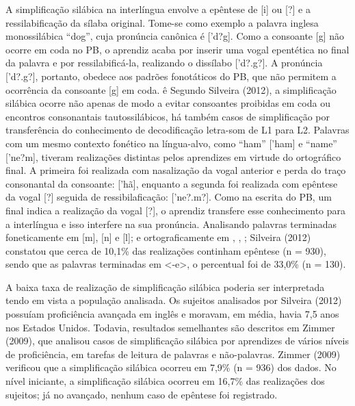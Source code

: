 A simplifica\c{c}\~ao sil\'abica na interl\'ingua envolve a ep\^entese de {[}i{]} ou
{[}?{]} e a ressilabifica\c{c}\~ao da s\'ilaba original. Tome-se como exemplo a
palavra inglesa monossil\'abica ``dog'', cuja pron\'uncia can\^onica \'e
{[}'d?g{]}. Como a consoante {[}g{]} n\~ao ocorre em coda no PB, o
aprendiz acaba por inserir uma vogal epent\'etica no final da palavra e
por ressilabific\'a-la, realizando o diss\'ilabo {[}'d?.g?{]}. A pron\'uncia
{[}'d?.g?{]}, portanto, obedece aos padr\~oes fonot\'aticos do PB, que n\~ao
permitem a ocorr\^encia da consoante {[}g{]} em coda.
ê
Segundo Silveira (2012), a simplifica\c{c}\~ao sil\'abica ocorre n\~ao apenas de
modo a evitar consoantes proibidas em coda ou encontros consonantais
tautossil\'abicos, h\'a tamb\'em casos de simplifica\c{c}\~ao por transfer\^encia do
conhecimento de decodifica\c{c}\~ao letra-som de L1 para L2. Palavras com um
mesmo contexto fon\'etico na l\'ingua-alvo, como ``ham'' {[}'ham{]} e
``name'' {[}'ne?m{]}, tiveram realiza\c{c}\~oes distintas pelos aprendizes em
virtude do ortogr\'afico final. A primeira foi realizada com nasaliza\c{c}\~ao
da vogal anterior e perda do tra\c{c}o consonantal da consoante: {[}'h\~a{]},
enquanto a segunda foi realizada com ep\^entese da vogal {[}?{]} seguida
de ressibilafica\c{c}\~ao: {[}'ne?.m?{]}. Como na escrita do PB, um final
indica a realiza\c{c}\~ao da vogal {[}?{]}, o aprendiz transfere esse
conhecimento para a interl\'ingua e isso interfere na sua pron\'uncia.
Analisando palavras terminadas foneticamente em {[}m{]}, {[}n{]} e
{[}l{]}; e ortograficamente em , , ; Silveira (2012) constatou que cerca
de 10,1\% das realiza\c{c}\~oes continham ep\^entese (n = 930), sendo que as
palavras terminadas em \textless{}-e\textgreater{}, o percentual foi de
33,0\% (n = 130).

A baixa taxa de realiza\c{c}\~ao de simplifica\c{c}\~ao sil\'abica poderia ser
interpretada tendo em vista a popula\c{c}\~ao analisada. Os sujeitos
analisados por Silveira (2012) possu\'iam profici\^encia avan\c{c}ada em ingl\^es
e moravam, em m\'edia, havia 7,5 anos nos Estados Unidos. Todavia,
resultados semelhantes s\~ao descritos em Zimmer (2009), que analisou
casos de simplifica\c{c}\~ao sil\'abica por aprendizes de v\'arios n\'iveis de
profici\^encia, em tarefas de leitura de palavras e n\~ao-palavras. Zimmer
(2009) verificou que a simplifica\c{c}\~ao sil\'abica ocorreu em 7,9\% (n = 936)
dos dados. No n\'ivel iniciante, a simplifica\c{c}\~ao sil\'abica ocorreu em
16,7\% das realiza\c{c}\~oes dos sujeitos; j\'a no avan\c{c}ado, nenhum caso de
ep\^entese foi registrado.

